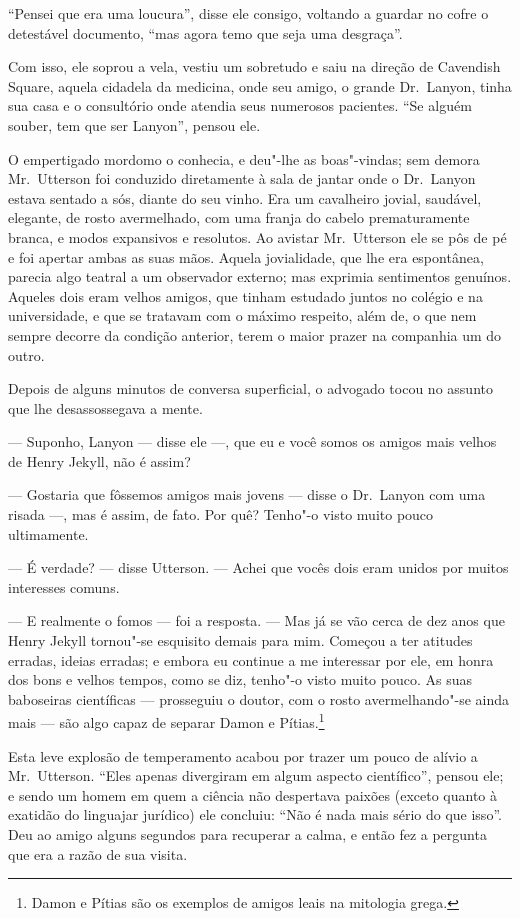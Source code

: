 “Pensei que era uma loucura”, disse ele consigo, voltando a guardar no
cofre o detestável documento, “mas agora temo que seja uma desgraça”.

Com isso, ele soprou a vela, vestiu um sobretudo e saiu na direção de
Cavendish Square, aquela cidadela da medicina, onde seu amigo, o grande
Dr.~Lanyon, tinha sua casa e o consultório onde atendia seus numerosos
pacientes.  “Se alguém souber, tem que ser Lanyon”, pensou ele.

O empertigado mordomo o conhecia, e deu"-lhe as boas"-vindas; sem demora
Mr.~Utterson foi conduzido diretamente à sala de jantar onde o Dr.~Lanyon 
estava sentado a sós, diante do seu vinho. Era um cavalheiro
jovial, saudável, elegante, de rosto avermelhado, com uma franja do
cabelo prematuramente branca, e modos expansivos e resolutos.  Ao
avistar Mr.~Utterson ele se pôs de pé e foi apertar ambas as suas mãos.
 Aquela jovialidade, que lhe era espontânea, parecia algo teatral a um
observador externo; mas exprimia sentimentos genuínos.  Aqueles dois
eram velhos amigos, que tinham estudado juntos no colégio e na
universidade, e que se tratavam com o máximo respeito, além de, o que
nem sempre decorre da condição anterior, terem o maior prazer na
companhia um do outro. 

Depois de alguns minutos de conversa superficial, o advogado tocou no
assunto que lhe desassossegava a mente.

--- Suponho, Lanyon --- disse ele ---, que eu e você somos os amigos mais
velhos de Henry Jekyll, não é assim? 

--- Gostaria que fôssemos amigos mais jovens --- disse o Dr.~Lanyon com
uma risada ---, mas é assim, de fato.  Por quê?  Tenho"-o visto muito pouco
ultimamente.

--- É verdade? --- disse Utterson. --- Achei que vocês dois eram unidos por
muitos interesses comuns.

--- E realmente o fomos --- foi a resposta. --- Mas já se vão cerca de dez
anos que Henry Jekyll tornou"-se esquisito demais para mim.  Começou a
ter atitudes erradas, ideias erradas; e embora eu continue a me
interessar por ele, em honra dos bons e velhos tempos, como se diz,
tenho"-o visto muito pouco.  As suas baboseiras científicas --- prosseguiu
o doutor, com o rosto avermelhando"-se ainda mais --- são algo capaz de
separar Damon e Pítias.\footnote{ Damon e Pítias são os exemplos de amigos
leais na mitologia grega.}

Esta leve explosão de temperamento acabou por trazer um pouco de alívio
a Mr.~Utterson. “Eles apenas divergiram em algum aspecto científico”,
pensou ele; e sendo um homem em quem a ciência não despertava paixões
(exceto quanto à exatidão do linguajar jurídico) ele concluiu: “Não é
nada mais sério do que isso”.  Deu ao amigo alguns segundos para
recuperar a calma, e então fez a pergunta que era a razão de sua
visita.

